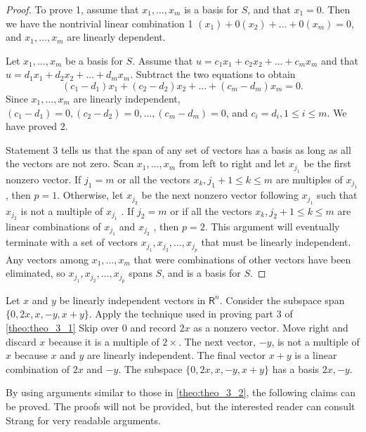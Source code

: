 \documentclass[../main.tex]{subfiles}
\begin{document}
\begin{proof}
	To prove 1, assume that $x_1, \ldots ,x_m$ is a basis for $S$, and that $x_1 = 0$. Then we have the nontrivial linear combination 1 $(x_1) + 0 (x_2) +\ldots + 0 (x_m) = 0$, and $x_1, \ldots ,x_m$ are linearly dependent.

	Let $x_1, \ldots ,x_m$ be a basis for $S$. Assume that $u = c_1 x_1 + c_2 x_2 + \ldots + c_m x_m$ and that $u = d_1 x_1 + d_2 x_2 +\ldots + d_m x_m$. Subtract the two equations to obtain
	$$(c_1 - d_1) x_1 + (c_2 - d_2) x_2 +\ldots + (c_m - d_m) x_m = 0.$$
	Since $x_1, \ldots ,x_m$ are linearly independent, $(c_1 - d_1) = 0, (c_2 - d_2) = 0, \ldots ,(c_m - d_m) = 0$, and $c_i = d_i, 1 \leq i \leq m.$ We have proved 2.

	Statement 3 tells us that the span of any set of vectors has a basis as long as all the vectors are not zero. Scan $x_1, \ldots ,x_m$ from left to right and let $x_{j_1}$ be the first nonzero vector. If $j_1 = m$ or all the vectors $x_k, j_1 + 1 \leq k \leq m$ are multiples of $x_{j_1}$ , then $p = 1$. Otherwise, let $x_{j_2}$ be the next nonzero vector following $x_{j_1}$ such that $x_{j_2}$ is not a multiple of $x_{j_1}$ . If $j_2 = m$ or if all the vectors $x_k, j_2 + 1 \leq k \leq m$ are linear combinations of $x_{j_1}$ and $x_{j_2}$ , then $p = 2$. This argument will eventually terminate with a set of vectors $x_{j_1} , x_{j_2} , \ldots  , x_{j_p}$  that must be linearly independent. Any vectors among $x_1, \ldots ,x_m$ that were combinations of other vectors have been eliminated, so $x_{j_1} , x_{j_2} , \ldots  , x_{j_p}$ spans $S$, and is a basis for $S$.
\end{proof}

\begin{example} Let $x$ and $y$ be linearly independent vectors in $\mathsf{R}^{n}$. Consider the subspace span $\{0, 2x, x, -y, x + y\}$. Apply the technique used in proving part 3 of \autoref{theo:theo_3_1} Skip over 0 and record $2x$ as a nonzero vector. Move right and discard $x$ because it is a multiple of $2\times$. The next vector, $-y$, is not a multiple of $x$ because $x$ and $y$ are linearly independent. The final vector $x + y$ is a linear combination of $2x$ and $-y$. The subspace $\{0, 2x, x, -y, x + y\}$ has a basis $2x, -y.$
\end{example}

By using arguments similar to those in \autoref{theo:theo_3_2}, the following claims can be proved. The proofs will not be provided, but the interested reader can consult Strang \cite[pp. 175-175]{ref8} for very readable arguments.
\end{document}
